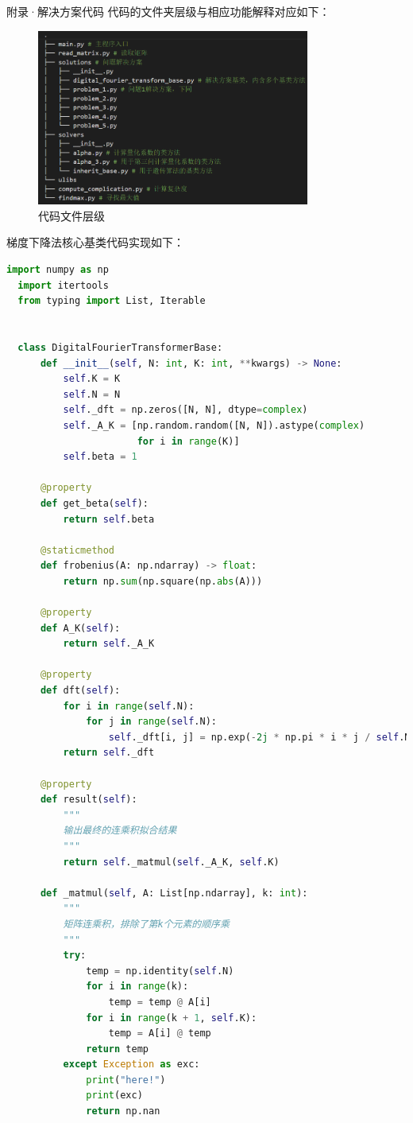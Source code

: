 \documentclass[11pt]{article}
\begin{document}
\begin{section}{附录·解决方案代码}
 代码的文件夹层级与相应功能解释对应如下：
 \begin{figure}[H]
   \centering
   \includegraphics[width=0.8\textwidth]{代码文件层级.png}
   \caption{代码文件层级}
   \label{fig:代码文件层级}
 \end{figure}
 梯度下降法核心基类代码实现如下：
 \begin{lstlisting}[language=Python ]
  import numpy as np
  import itertools
  from typing import List, Iterable
  
  
  class DigitalFourierTransformerBase:
      def __init__(self, N: int, K: int, **kwargs) -> None:
          self.K = K
          self.N = N
          self._dft = np.zeros([N, N], dtype=complex)
          self._A_K = [np.random.random([N, N]).astype(complex)
                       for i in range(K)]
          self.beta = 1
  
      @property
      def get_beta(self):
          return self.beta
  
      @staticmethod
      def frobenius(A: np.ndarray) -> float:
          return np.sum(np.square(np.abs(A)))
  
      @property
      def A_K(self):
          return self._A_K
  
      @property
      def dft(self):
          for i in range(self.N):
              for j in range(self.N):
                  self._dft[i, j] = np.exp(-2j * np.pi * i * j / self.N)
          return self._dft
  
      @property
      def result(self):
          """
          输出最终的连乘积拟合结果
          """
          return self._matmul(self._A_K, self.K)
  
      def _matmul(self, A: List[np.ndarray], k: int):
          """
          矩阵连乘积，排除了第k个元素的顺序乘
          """
          try:
              temp = np.identity(self.N)
              for i in range(k):
                  temp = temp @ A[i]
              for i in range(k + 1, self.K):
                  temp = A[i] @ temp
              return temp
          except Exception as exc:
              print("here!")
              print(exc)
              return np.nan
  

\end{lstlisting}
\end{section}
\end{document}
